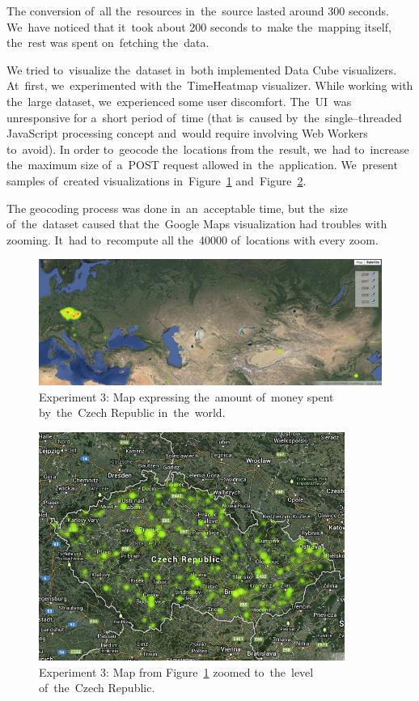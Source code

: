 The conversion of~all the~resources in~the~source lasted around 300 seconds. We~have noticed that it~took about 200 seconds to~make the~mapping itself, the~rest 
was spent on~fetching the~data.

We tried to~visualize the~dataset in~both implemented Data Cube visualizers. At~first, we~experimented 
with the~TimeHeatmap visualizer. While working with the~large dataset, we~experienced some user discomfort. The~UI~was unresponsive for a~short period of~time
(that is~caused by~the~single--threaded JavaScript processing concept and~would require
involving Web Workers to~avoid). 
In order to~geocode the~locations from the~result, we~had to~increase the~maximum size of~a~POST request allowed in~the~application. We~present samples of~created visualizations in~Figure~\ref{fig:contracts-map-world} and~Figure~\ref{fig:contracts-map-zoomed}.

\begin{sloppypar}
The geocoding process was done in~an~acceptable time, but the~size of~the~dataset caused that the~Google Maps visualization had troubles with zooming. It~had to~recompute all the~40000 of~locations with every zoom.
\end{sloppypar}

\begin{figure}
  \centering
  \includegraphics[width=140mm]{img/contracts-map-world.png}
  \caption{Experiment 3: Map expressing the~amount of~money spent by~the~Czech Republic in~the~world.}
  \label{fig:contracts-map-world}
\end{figure}

\begin{figure}
  \centering
  \includegraphics[width=100mm]{img/contracts-map-zoomed.png}
  \caption{Experiment 3: Map from Figure~\ref{fig:contracts-map-world} zoomed to~the~level of~the~Czech Republic.}
  \label{fig:contracts-map-zoomed}
\end{figure}

